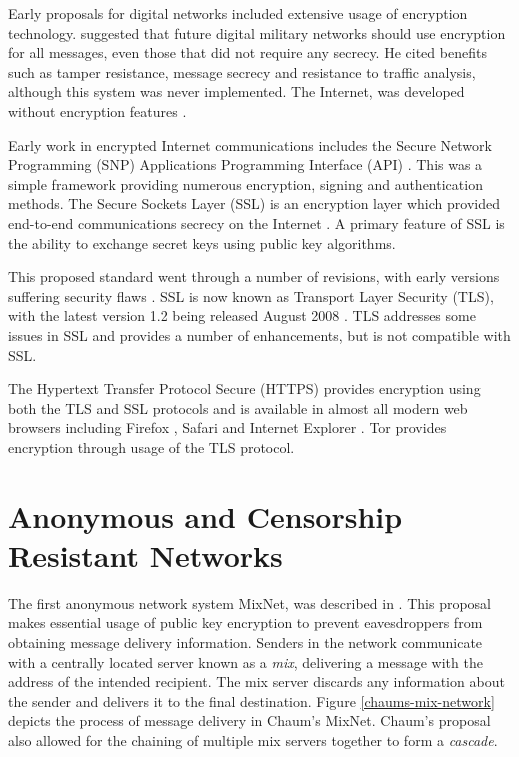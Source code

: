 \documentclass{ecuthesis}
\begin{document}
Early proposals for digital networks included extensive usage of encryption
technology. \textcite{Baran:1964p384} suggested that future digital military
networks should use encryption for all messages, even those that did not
require any secrecy. He cited benefits such as tamper resistance, message
secrecy and resistance to traffic analysis, although this system was never
implemented. The Internet, was developed without encryption features
\parencite{website:internet}.

Early work in encrypted Internet communications includes the Secure Network
Programming (SNP) Applications Programming Interface (API)
\parencite{Woo:1994p2532}. This was a simple framework providing numerous
encryption, signing and authentication methods. The Secure Sockets Layer (SSL)
is an encryption layer which provided end-to-end communications secrecy on the
Internet \parencite{website:SSL}. A primary feature of SSL is the ability to
exchange secret keys using public key algorithms.

This proposed standard went through a number of revisions, with early versions
suffering security flaws \parencite{Wagner:1996p385}. SSL is now known as
Transport Layer Security (TLS), with the latest version 1.2 being released
August 2008 \parencite{website:TLS}. TLS addresses some issues in SSL and
provides a number of enhancements, but is not compatible with SSL.

The Hypertext Transfer Protocol Secure (HTTPS) provides encryption using both
the TLS and SSL protocols \parencite{website:HTTPS} and is available in almost
all modern web browsers including Firefox
\parencite{website:firefox-encryption}, Safari
\parencite{website:safari-features} and Internet Explorer
\parencite{website:microsoft-tls}. Tor provides encryption through usage of the
TLS protocol.

\section{Anonymous and Censorship Resistant Networks}

The first anonymous network system MixNet, was described in
\textcite{Chaum:1981p296}. This proposal makes essential usage of public key
encryption to prevent eavesdroppers from obtaining message delivery information.
Senders in the network communicate with a centrally located server known as a
\emph{mix}, delivering a message with the address of the intended recipient. The
mix server discards any information about the sender and delivers it to the
final destination. Figure \ref{chaums-mix-network} depicts the process of
message delivery in Chaum's MixNet. Chaum's proposal also allowed for the
chaining of multiple mix servers together to form a \emph{cascade}.
\end{document}
